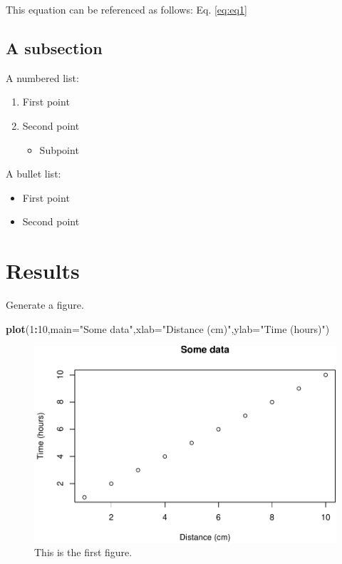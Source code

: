 \documentclass[12pt,halfline,a4paper,]{ouparticle}
\newenvironment{Shaded}{\begin{snugshade}}{\end{snugshade}}
\newcommand{\DataTypeTok}[1]{\textcolor[rgb]{0.13,0.29,0.53}{#1}}
\newcommand{\DecValTok}[1]{\textcolor[rgb]{0.00,0.00,0.81}{#1}}
\newcommand{\KeywordTok}[1]{\textcolor[rgb]{0.13,0.29,0.53}{\textbf{#1}}}
\newcommand{\NormalTok}[1]{#1}
\newcommand{\OperatorTok}[1]{\textcolor[rgb]{0.81,0.36,0.00}{\textbf{#1}}}
\newcommand{\StringTok}[1]{\textcolor[rgb]{0.31,0.60,0.02}{#1}}
\providecommand{\tightlist}{%
  \setlength{\itemsep}{0pt}\setlength{\parskip}{0pt}}
\begin{document}
This equation can be referenced as follows: Eq. \ref{eq:eq1}

\hypertarget{a-subsection}{%
\subsection{A subsection}\label{a-subsection}}

A numbered list:

\begin{enumerate}
\def\labelenumi{\arabic{enumi})}
\tightlist
\item
  First point
\item
  Second point

  \begin{itemize}
  \tightlist
  \item
    Subpoint
  \end{itemize}
\end{enumerate}

A bullet list:

\begin{itemize}
\tightlist
\item
  First point
\item
  Second point
\end{itemize}

\hypertarget{results-1}{%
\section{Results}\label{results-1}}

Generate a figure.

\begin{Shaded}
\begin{Highlighting}[]
\KeywordTok{plot}\NormalTok{(}\DecValTok{1}\OperatorTok{:}\DecValTok{10}\NormalTok{,}\DataTypeTok{main=}\StringTok{"Some data"}\NormalTok{,}\DataTypeTok{xlab=}\StringTok{"Distance (cm)"}\NormalTok{,}\DataTypeTok{ylab=}\StringTok{"Time (hours)"}\NormalTok{)}
\end{Highlighting}
\end{Shaded}

\begin{figure}[p]
\includegraphics[width=1\linewidth]{manuscript_reaction_times_2020_files/figure-latex/fig1-1} \caption{This is the first figure.}\label{fig:fig1}
\end{figure}
\end{document}
